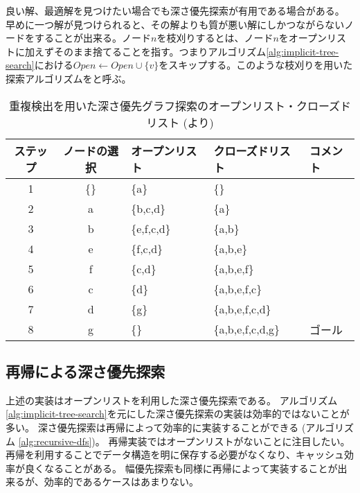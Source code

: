 良い解、最適解を見つけたい場合でも深さ優先探索が有用である場合がある。
早めに一つ解が見つけられると、その解よりも質が悪い解にしかつながらないノードをすることが出来る。ノード$n$を枝刈りするとは、ノード$n$をオープンリストに加えずそのまま捨てることを指す。つまりアルゴリズム\ref{alg:implicit-tree-search}における$Open \leftarrow Open \cup \{v\}$をスキップする。このような枝刈りを用いた探索アルゴリズムをと呼ぶ。

\begin{table}[tbh]
\centering
\caption{重複検出を用いた深さ優先グラフ探索のオープンリスト・クローズドリスト (\cite{edelkamp:2010:hst:1875144}より)}
\begin{tabular}{c|c|l|l|l}
  \toprule
	ステップ & ノードの選択 & オープンリスト   & クローズドリスト & コメント \\ \midrule
	1 	  & \{\}     & \{a\}       & \{\} \\
	2     & a        & \{b,c,d\}   & \{a\} \\
	3     & b        & \{e,f,c,d\} & \{a,b\} \\
	4     & e        & \{f,c,d\}   & \{a,b,e\} \\
	5     & f        & \{c,d\}     & \{a,b,e,f\} \\
	6     & c        & \{d\}       & \{a,b,e,f,c\} \\
	7     & d        & \{g\}       & \{a,b,e,f,c,d\} \\
	8     & g        & \{\}        & \{a,b,e,f,c,d,g\} & ゴール \\
        \bottomrule
\end{tabular}
\label{tbl:dfs-traj}
\end{table}

\subsection{再帰による深さ優先探索}
\label{sec:recursive-depth-first-search}

上述の実装はオープンリストを利用した深さ優先探索である。
アルゴリズム \ref{alg:implicit-tree-search}を元にした深さ優先探索の実装は効率的ではないことが多い。
深さ優先探索は再帰によって効率的に実装することができる (アルゴリズム \ref{alg:recursive-dfs})。
再帰実装ではオープンリストがないことに注目したい。
再帰を利用することでデータ構造を明に保存する必要がなくなり、キャッシュ効率が良くなることがある。
幅優先探索も同様に再帰によって実装することが出来るが、効率的であるケースはあまりない。

